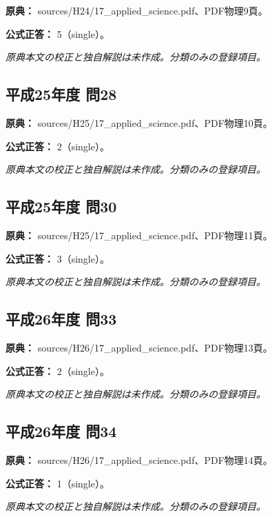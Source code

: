 \noindent\textbf{原典：} sources/H24/17\_applied\_science.pdf、PDF物理9頁。

\textbf{公式正答：} 5（single）。

\par\textit{原典本文の校正と独自解説は未作成。分類のみの登録項目。}

\subsection{平成25年度 問28}
\label{q:h25-reg-applied-28}

\noindent\textbf{原典：} sources/H25/17\_applied\_science.pdf、PDF物理10頁。

\textbf{公式正答：} 2（single）。

\par\textit{原典本文の校正と独自解説は未作成。分類のみの登録項目。}

\subsection{平成25年度 問30}
\label{q:h25-reg-applied-30}

\noindent\textbf{原典：} sources/H25/17\_applied\_science.pdf、PDF物理11頁。

\textbf{公式正答：} 3（single）。

\par\textit{原典本文の校正と独自解説は未作成。分類のみの登録項目。}

\subsection{平成26年度 問33}
\label{q:h26-reg-applied-33}

\noindent\textbf{原典：} sources/H26/17\_applied\_science.pdf、PDF物理13頁。

\textbf{公式正答：} 2（single）。

\par\textit{原典本文の校正と独自解説は未作成。分類のみの登録項目。}

\subsection{平成26年度 問34}
\label{q:h26-reg-applied-34}

\noindent\textbf{原典：} sources/H26/17\_applied\_science.pdf、PDF物理14頁。

\textbf{公式正答：} 1（single）。

\par\textit{原典本文の校正と独自解説は未作成。分類のみの登録項目。}


